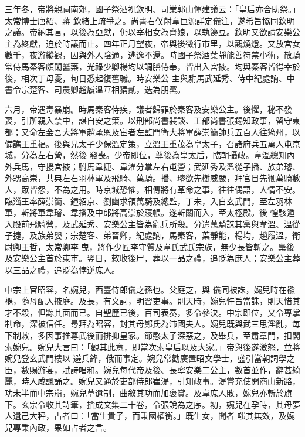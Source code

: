 \begin{pinyinscope}
 三年冬，帝將親祠南郊，國子祭酒祝欽明、司業郭山惲建議云：「皇后亦合助祭。」太常博士唐紹、蔣
 欽緒上疏爭之。尚書右僕射韋巨源詳定儀注，遂希旨協同欽明之議。帝納其言，以後為亞獻，仍以宰相女為齊娘，以執籩豆。欽明又欲請安樂公主為終獻，迫於時議而止。四年正月望夜，帝與後微行市里，以觀燒燈。又放宮女數千，夜游縱觀，因與外人陰通，逃逸不還。時國子祭酒葉靜能善符禁小術，散騎常侍馬秦客頗閑醫藥，光祿少卿楊均以調膳侍奉，皆出入宮掖。均與秦客皆得幸於後，相次丁母憂，旬日悉起復舊職。時安樂公
 主與駙馬武延秀、侍中紀處訥、中書令宗楚客、司農卿趙履溫互相猜貳，迭為朋黨。



 六月，帝遇毒暴崩。時馬秦客侍疾，議者歸罪於秦客及安樂公主。後懼，秘不發喪，引所親入禁中，謀自安之策。以刑部尚書裴談、工部尚書張錫知政事，留守東都；又命左金吾大將軍趙承恩及宦者左監門衛大將軍薛崇簡帥兵五百人往筠州，以備譙王重福。後與兄太子少保溫定策，立溫王重茂為皇太子，召諸府兵五萬人屯京城，分為左右營，然後
 發喪。少帝即位，尊後為皇太后，臨朝攝政。韋溫總知內外兵馬，守援宮掖；駙馬韋捷、韋濯分掌左右屯營；武延秀及溫從子播、族弟璿、外甥高崇，共典左右羽林軍及飛騎、萬騎。播、璿欲先樹威嚴，拜官日先鞭萬騎數人，眾皆怨，不為之用。時京城恐懼，相傳將有革命之事，往往偶語，人情不安。臨淄王率薛崇簡、鐘紹京、劉幽求領萬騎及總監，丁未，入自玄武門，至左羽林軍，斬將軍韋璿、韋播及中郎將高崇於寢帳。遂斬關而入，至太極殿。後
 惶駭遁入殿前飛騎營，及武延秀、安樂公主皆為亂兵所殺。分遣萬騎誅其黨與韋溫、溫從子捷，及族弟嬰；宗楚客、弟晉卿，紀處訥，馬秦客，葉靜能，楊均，趙履溫，衛尉卿王哲，太常卿李曳，將作少匠李守質及韋氏武氏宗族，無少長皆斬之。梟後及安樂公主首於東市。翌日，敕收後尸，葬以一品之禮，追貶為庶人；安樂公主葬以三品之禮，追貶為悖逆庶人。



 中宗上官昭容，名婉兒，西臺侍郎儀之孫也。父庭芝，與
 儀同被誅，婉兒時在襁褓，隨母配入掖庭。及長，有文詞，明習吏事。則天時，婉兒忤旨當誅，則天惜其才不殺，但黥其面而已。自聖歷已後，百司表奏，多令參決。中宗即位，又令專掌制命，深被信任。尋拜為昭容，封其母鄭氏為沛國夫人。婉兒既與武三思淫亂，每下制敕，多因事推尊武後而排抑皇家。節愍太子深惡之，及舉兵，至肅章門，扣閣索婉兒。婉兒大言曰：「觀其此意，即當次索皇后以及大家。」帝與後遂激怒，並將婉兒登玄武門樓以
 避兵鋒，俄而事定。婉兒常勸廣置昭文學士，盛引當朝詞學之臣，數賜游宴，賦詩唱和。婉兒每代帝及後、長寧安樂二公主，數首並作，辭甚綺麗，時人咸諷誦之。婉兒又通於吏部侍郎崔湜，引知政事。湜嘗充使開商山新路，功未半而中宗崩，婉兒草遺制，曲敘其功而加褒賞。及韋庶人敗，婉兒亦斬於旗下。玄宗令收其詩筆，撰成文集二十卷，令張說為之序。初，婉兒在孕時，其母夢人遺己大秤，占者曰：「當生貴子，而秉國權衡。」既生女，聞者
 嗤其無效，及婉兒專秉內政，果如占者之言。




\end{pinyinscope}
